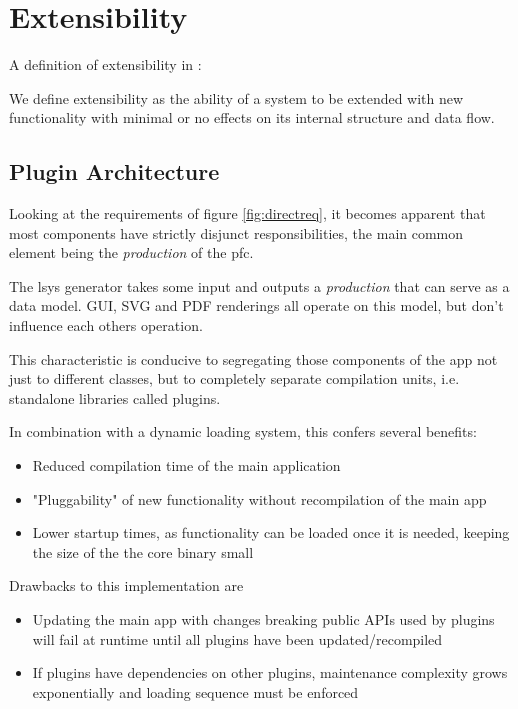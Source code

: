 \section{Extensibility}

A definition of extensibility in \citet[p.3]{Johansson}:
\begin{definition}[Extensibility]
We define extensibility as the ability of a system to be extended with new functionality with minimal or no effects on its internal structure and data flow.
\end{definition}

\subsection{Plugin Architecture}\label{sec:resplug}
Looking at the requirements of figure \ref{fig:directreq}, it becomes apparent that most components have strictly disjunct responsibilities, the main common element being the \textit{production} of the \gls{pfc}.

The \gls{lsys} generator takes some input and outputs a \textit{production} that can serve as a data model. GUI, SVG and PDF renderings all operate on this model, but don't influence each others operation.

This characteristic is conducive to segregating those components of the app not just to different classes, but to completely separate compilation units, i.e. standalone libraries called plugins.

In combination with a dynamic loading system, this confers several benefits:

\begin{itemize}
	\item  Reduced compilation time of the main application
	\item  "Pluggability" of new functionality without recompilation of the main app
	\item  Lower startup times, as functionality can be loaded once it is needed, keeping the size of the the core binary small
\end{itemize}

Drawbacks to this implementation are
\begin{itemize}
	\item Updating the main app with changes breaking public APIs used by plugins will fail at runtime until all plugins have been updated/recompiled
	\item If plugins have dependencies on other plugins, maintenance complexity grows exponentially and loading sequence must be enforced
\end{itemize}

